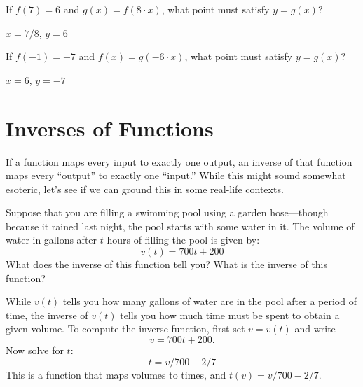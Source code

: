 \begin{exercises}
\begin{exercise} 
If $f(7) = 6$ and $g(x)=f(8\cdot x)$, what point must satisfy $y=g(x)$?
\begin{answer}
$x=7/8$, $y=6$
\end{answer}
\end{exercise}

\begin{exercise} 
If $f(-1) = -7$ and $f(x)=g(-6\cdot x)$, what point must satisfy
$y=g(x)$?
\begin{answer}
$x=6$, $y=-7$
\end{answer}
\end{exercise}

\end{exercises}








\section{Inverses of Functions}


If a function maps every input to exactly one output, an inverse of that
function maps every ``output'' to exactly one ``input.'' While this
might sound somewhat esoteric, let's see if we can ground this in
some real-life contexts.

\begin{example}
Suppose that you are filling a swimming pool using a garden
hose---though because it rained last night, the pool starts with some
water in it. The volume of water in gallons after $t$ hours of
filling the pool is given by:
\[
v(t) = 700t + 200
\]
What does the inverse of this function tell you? What is the inverse
of this function?
\end{example}


\begin{solution}
While $v(t)$ tells you how many gallons of water are in the pool after
a period of time, the inverse of $v(t)$ tells you how much time must
be spent to obtain a given volume. To compute the inverse function,
first set $v=v(t)$ and write
\[
v = 700t + 200.
\]
Now solve for $t$:
\[
t = v/700 - 2/7
\]
This is a function that maps volumes to times, and 
$t(v) = v/700-2/7$.
\end{solution}



